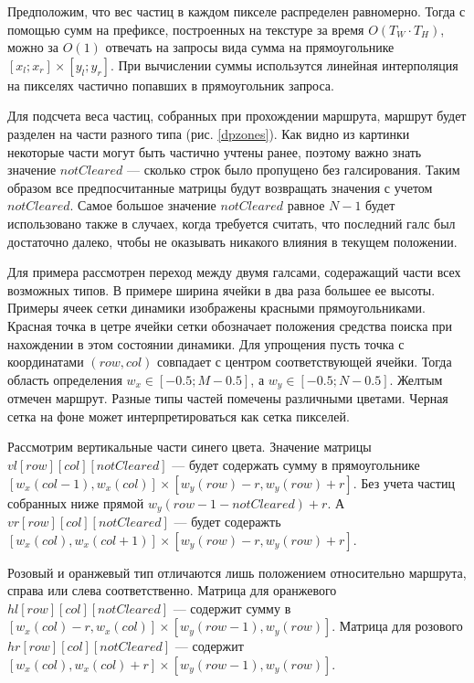 Предположим, что вес частиц в каждом пикселе распределен равномерно. Тогда с помощью
сумм на префиксе, построенных на текстуре за время $O(T_W \cdot T_H)$, можно за $O(1)$
отвечать на запросы вида сумма на прямоугольнике $[x_l ; x_r] \times [y_l ; y_r]$.
При вычислении суммы использутся линейная интерполяция на пикселях частично попавших
в прямоугольник запроса.


Для подсчета веса частиц, собранных при прохождении маршрута, маршрут будет разделен на
части разного типа (рис. \ref{dpzones}). Как видно из картинки некоторые части могут
быть частично учтены ранее, поэтому важно знать значение $notCleared$ --- сколько строк
было пропущено без галсирования. Таким образом все предпосчитанные матрицы будут возвращать
значения с учетом $notCleared$. Самое большое значение $notCleared$ равное $N-1$ будет
использовано также в случаех, когда требуется считать, что последний галс был
достаточно далеко, чтобы не оказывать никакого влияния в текущем положении.

Для примера рассмотрен переход между двумя галсами, содеражащий части всех возможных типов.
В примере ширина ячейки в два раза большее ее высоты. Примеры ячеек сетки динамики 
изображены красными прямоугольниками. Красная точка в цетре 
ячейки сетки обозначает положения средства поиска при нахождении в этом состоянии динамики.
Для упрощения пусть точка с координатами $(row, col)$ совпадает с центром соответствующей ячейки.
Тогда область определения $w_x \in [-0.5; M-0.5]$, а $w_y \in [-0.5; N-0.5]$.
Желтым отмечен маршрут. Разные типы частей помечены различными цветами. Черная сетка на
фоне может интерпретироваться как сетка пикселей.

Рассмотрим вертикальные части синего цвета. Значение матрицы $vl[row][col][notCleared]$ ---
будет содержать сумму в прямоугольнике
$[w_x(col-1), w_x(col)] \times [w_y(row)-r, w_y(row)+r]$. Без 
учета частиц собранных ниже прямой $w_y(row-1-notCleared) + r$. А $vr[row][col][notCleared]$ --- 
будет содеражть $[w_x(col), w_x(col+1)] \times [w_y(row)-r, w_y(row)+r]$.

Розовый и оранжевый тип отличаются лишь положением относительно маршрута, справа или слева
соответственно. Матрица для оранжевого 
$hl[row][col][notCleared]$ --- содержит сумму в
$[w_x(col)-r, w_x(col)] \times [w_y(row-1), w_y(row)]$. Матрица для розового
$hr[row][col][notCleared]$ --- содержит $[w_x(col), w_x(col)+r] \times [w_y(row-1), w_y(row)]$.

